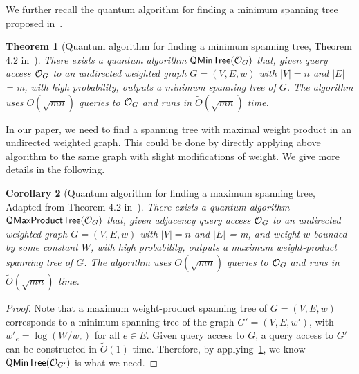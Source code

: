 \documentclass[11pt]{article}
\newtheorem{theorem}{Theorem} \newtheorem{lemma}[theorem]{Lemma} \newtheorem{proposition}[theorem]{Proposition} \newtheorem{corollary}[theorem]{Corollary} \newtheorem{definition}[theorem]{Definition} \newtheorem{conjecture}[theorem]{Conjecture} \newtheorem{claim}[theorem]{Claim} \newtheorem{fact}[theorem]{Fact}
\newcommand{\abss}[1]{\left\lvert #1 \right\rvert}
\begin{document}
{We further recall the quantum algorithm for 
finding a minimum spanning tree proposed in~\cite{DHHM06}.
\begin{theorem}[Quantum algorithm for finding a minimum spanning tree, Theorem 4.2 in~\cite{DHHM06}]\label{thm:min-spanning-tree-finding}
  There exists a quantum algorithm $\mathsf{QMinTree}(\mathcal{O}_{G})$ that, given
  query access $\mathcal{O}_{G}$ to an undirected weighted graph $G = (V, E, w)$ with
  $\abss{V} = n$ and $\abss{E}$ = m, with high probability, outputs a minimum
  spanning tree of $G$.
  The algorithm uses $O(\sqrt{mn})$ queries to $\mathcal{O}_{G}$ and runs in
  $\widetilde{O} (\sqrt{mn})$ time.
\end{theorem}

In our paper, we need to find a spanning tree
with maximal weight product 
in an undirected weighted graph.
This could
be done by directly applying above algorithm
to the same graph with 
slight modifications of weight.
We give more details in the following.

\begin{corollary}[Quantum algorithm for finding a maximum spanning tree, Adapted from Theorem 4.2 in~\cite{DHHM06}]\label{cor:max-weight-spanning-tree-finding}
  There exists a quantum algorithm $\mathsf{QMaxProductTree}(\mathcal{O}_{G})$ that, given adjacency
  query access $\mathcal{O}_{G}$ to an undirected weighted graph $G = (V, E, w)$ with
  $\abss{V} = n$ and $\abss{E}$ = m, and weight $w$ bounded
  by some constant $W$, 
  with high probability, outputs a maximum weight-product
  spanning tree of $G$.
  The algorithm uses $O(\sqrt{mn})$ queries to $\mathcal{O}_{G}$ and runs in
  $\widetilde{O} (\sqrt{mn})$ time.
\end{corollary}

\begin{proof}
    Note that a maximum weight-product spanning tree of 
    $G = (V, E, w)$ corresponds to a minimum spanning tree
    of the graph $G' = (V, E, w')$,
    with $w'_e = \log (W/w_e)$ for all $e\in E$.
    Given query access to $G$,
    a query access to $G'$ can be constructed in $\widetilde{O}(1)$ time.
    Therefore, by applying~\cref{thm:min-spanning-tree-finding},
    we know $\mathsf{QMinTree}(\mathcal{O}_{G'})$ is what we need.
\end{proof}

}
\end{document}
